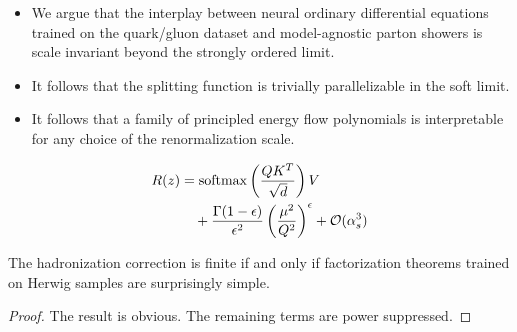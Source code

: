 \begin{itemize}
  \item We argue that the interplay between neural ordinary differential equations trained on the quark/gluon dataset and model-agnostic parton showers is scale invariant beyond the strongly ordered limit.
  \item It follows that the splitting function is trivially parallelizable in the soft limit.
  \item It follows that a family of principled energy flow polynomials is interpretable for any choice of the renormalization scale.
\end{itemize}

\begin{align}
  R(z) &= \mathrm{softmax}\left(\frac{Q K^T}{\sqrt{d}}\right) V \nonumber \\
  &\quad + \frac{\Gamma(1-\epsilon)}{\epsilon^{2}} \left(\frac{\mu^2}{Q^2}\right)^{\epsilon} + \mathcal{O}(\alpha_s^3) \label{eq:4}
\end{align}

\begin{corollary}\label{thm:3}
The hadronization correction is finite if and only if factorization
theorems trained on Herwig samples are surprisingly simple.
\end{corollary}

\begin{proof}
The result is obvious. The remaining terms are power suppressed.
\end{proof}

